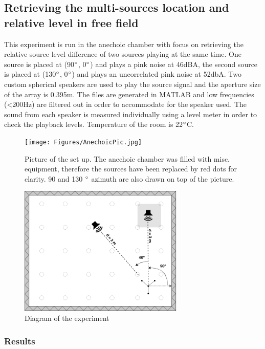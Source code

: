 \newpage
\subsection{Retrieving the multi-sources location and relative level in free field}

This experiment is run in the anechoic chamber with focus on retrieving the relative source level difference of two sources playing at the same time. One source is placed at (90$\degree$, 0$\degree$) and plays a pink noise at 46dBA, the second source is placed at (130$\degree$, 0$\degree$) and plays an uncorrelated pink noise at 52dbA. Two custom spherical speakers are used to play the source signal and the aperture size of the array is 0.395m. The files are generated in MATLAB and low frequencies (<200Hz) are filtered out in order to accommodate for the speaker used.  The sound from each speaker is measured individually using a level meter in order to check the playback levels. Temperature of the room is 22$\degree$C.

\begin{figure}[H]
    \centering
    \texttt{[image: Figures/AnechoicPic.jpg]}
    \caption{Picture of the set up. The anechoic chamber was filled with misc. equipment, therefore the sources have been replaced by red dots for clarity. 90 and 130 $\degree$ azimuth are also drawn on top of the picture.}
    \label{fig:Anechoicpic1}
\end{figure}

\begin{figure}[H]
    \centering
    \includegraphics[width=0.7\textwidth]{Figures/Anechoicexp3.png}
    \caption{Diagram of the experiment}
    \label{fig:Anechoicexp3}
\end{figure}

\subsubsection{Results}

